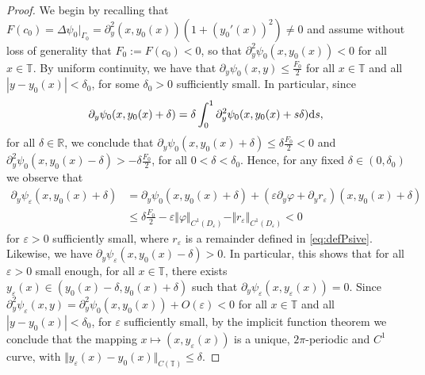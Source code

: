 \documentclass[11pt,reqno]{amsproc}
\newcommand{\R}{\mathbb{R}}
\newcommand{\ve}{\varepsilon}
\newcommand{\rmd}{{\rm d}}
\numberwithin{equation}{section}
\numberwithin{theorem}{section}
\numberwithin{prop}{section}
\numberwithin{cor}{section}
\numberwithin{lemma}{section}
\theoremstyle{remark}
\theoremstyle{definition}
\begin{document}
\begin{proof}
We begin by recalling that $F(c_0)=\Delta\psi_0|_{\Gamma_0}= \partial_y^2(x,y_0(x))\left( 1 + (y_0'(x))^2\right)\neq 0$ and assume without loss of generality that $F_0:=F(c_0)<0$, so that $\partial_y^2\psi_0(x,y_0(x))<0$ for all $x\in \mathbb{T}$. By uniform continuity, we have that $\partial_y\psi_0(x,y)\leq \frac{F_0}{2}$ for all $x\in \mathbb{T}$ and all $|y-y_0(x)|<\delta_0$, for some $\delta_0>0$ sufficiently small. In particular, since
\begin{align*}
\partial_y\psi_0(x,y_0(x) + \delta) = \delta\int_0^1 \partial_y^2\psi_0(x,y_0(x) + s\delta)\rmd s ,
\end{align*} 
for all $\delta\in \R$, we conclude that $\partial_y\psi_0(x,y_0(x)+\delta) \leq \delta \frac{F_0}{2} <0$ and $\partial_y^2\psi_0(x,y_0(x) - \delta) > -\delta\frac{F_0}{2}$, for all $0 < \delta < \delta_0$. Hence, for any fixed $\delta\in (0,\delta_0)$ we observe that
\begin{align*}
\partial_y\psi_{\ve}(x,y_0(x) +\delta) &= \partial_y\psi_0(x,y_0(x) +\delta) +\left( \ve\partial_y\varphi + \partial_y r_{\ve} \right)(x,y_0(x) +\delta) \\&
\leq \delta\frac{ F_0}{2} - \ve \Vert \varphi\Vert_{C^1(D_\ve)} - \Vert r_{\ve} \Vert_{C^1(D_\ve)} <0
\end{align*}
for $\ve>0$ sufficiently small, 
where $r_\ve$ is a remainder defined in \eqref{eq:defPsive}. Likewise, we have $\partial_y \psi_{\ve}(x,y_0(x) -\delta) >0$. In particular, this shows that for all $\ve>0$ small enough, for all $x\in\mathbb{T}$, there exists $y_{\ve}(x)\in (y_0(x)-\delta, y_0(x) + \delta)$ such that $\partial_y\psi_{\ve}(x,y_{\ve}(x))=0$. Since $\partial_y^2\psi_{\ve}(x,y) =\partial_y^2\psi_0(x,y_0(x)) +O(\ve) < 0$ for all $x\in \mathbb{T}$ and all $|y-y_0(x)|<\delta_0$, for $\ve$ sufficiently small, by the implicit function theorem we conclude that the mapping $x\mapsto (x,y_{\ve}(x))$ is a unique, $2\pi$-periodic and $C^1$ curve, with $\Vert y_\ve(x) - y_0(x) \Vert_{C(\mathbb{T})}\leq \delta$.


\end{proof}
\end{document}
